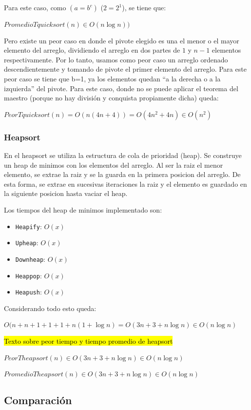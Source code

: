 \documentclass[article,a4paper]{article}
\begin{document}
Para este caso, como $(a = b^c)$ ($2 = 2^1$), se tiene que:

$PromedioTquicksort(n) \in O(n \log n))$

Pero existe un peor caso en donde el pivote elegido es una el menor o el mayor elemento del arreglo, dividiendo el arreglo en dos partes de $1$ y $n-1$ elementos respectivamente. Por lo tanto, usamos como peor caso un arreglo ordenado descendientemente y tomando de pivote el primer elemento del arreglo. Para este peor caso se tiene que b=1, ya los elementos quedan “a la derecha o a la izquierda” del pivote. Para este caso, donde no se puede aplicar el teorema del maestro (porque no hay división y conquista propiamente dicha) queda:

$PeorTquicksort(n) = O( n(4n + 4) ) =  O( 4n^2 + 4n) \in O(n^2)$

\subsubsection{Heapsort}

En el heapsort se utiliza la estructura de cola de prioridad (heap). Se construye un heap de minimos con los elementos del arreglo. Al ser la raiz el menor elemento, se extrae la raiz y se la guarda en la primera posicion del arreglo. De esta forma, se extrae en sucesivas iteraciones la raiz y el elemento es guardado en la siguiente posicion hasta vaciar el heap.

Los tiempos del heap de minimos implementado son:

\begin{itemize}
\item \texttt{Heapify}: $O(x)$
\item \texttt{Upheap}: $O(x)$
\item \texttt{Downheap}: $O(x)$
\item \texttt{Heappop}: $O(x)$
\item \texttt{Heapush}: $O(x)$
\end{itemize}

Considerando todo esto queda: 

$O( n + n +1 + 1 +1+n(1 + \log n  ) = O(3n + 3 + n \log n ) \in O(n \log n)$ 

\hl{Texto sobre peor tiempo y tiempo promedio de heapsort}

$PeorTheapsort(n)  \in O(3n + 3 + n \log n) \in O(n \log n)$

$PromedioTheapsort(n) \in O(3n + 3 +n \log n) \in O(n \log n)$ 

\subsection{Comparación}
\end{document}
